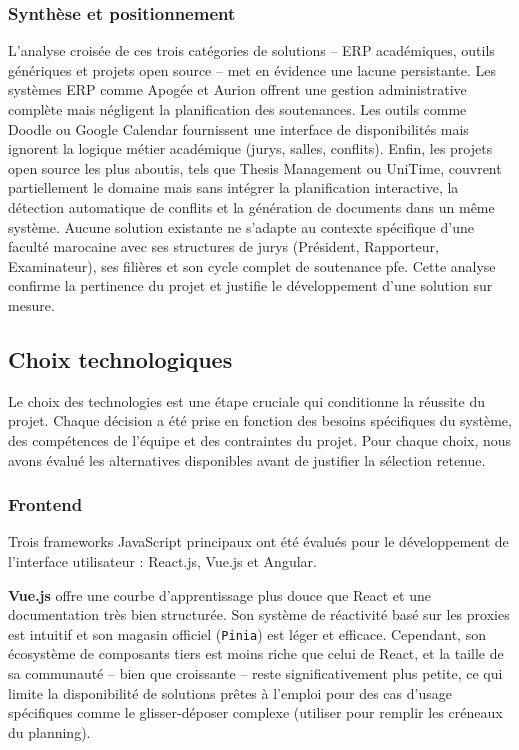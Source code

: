 \subsubsection{Synthèse et positionnement}
\label{ch2:synthese}

L'analyse croisée de ces trois catégories de solutions -- ERP académiques, outils génériques et projets open source -- met en évidence une lacune persistante. Les systèmes ERP comme Apogée et Aurion offrent une gestion administrative complète mais négligent la planification des soutenances. Les outils comme Doodle ou Google Calendar fournissent une interface de disponibilités mais ignorent la logique métier académique (jurys, salles, conflits). Enfin, les projets open source les plus aboutis, tels que Thesis Management ou UniTime, couvrent partiellement le domaine mais sans intégrer la planification interactive, la détection automatique de conflits et la génération de documents dans un même système. Aucune solution existante ne s'adapte au contexte spécifique d'une faculté marocaine avec ses structures de jurys (Président, Rapporteur, Examinateur), ses filières et son cycle complet de soutenance \acrshort{pfe}. Cette analyse confirme la pertinence du projet et justifie le développement d'une solution sur mesure.

\subsection{Choix technologiques}
\label{ch2:choix_technologiques}

Le choix des technologies est une étape cruciale qui conditionne la réussite du projet. Chaque décision a été prise en fonction des besoins spécifiques du système, des compétences de l'équipe et des contraintes du projet. Pour chaque choix, nous avons évalué les alternatives disponibles avant de justifier la sélection retenue.

\subsubsection{Frontend}
\label{ch2:frontend}

Trois frameworks JavaScript principaux ont été évalués pour le développement de l'interface utilisateur : React.js, Vue.js et Angular.

\textbf{Vue.js} offre une courbe d'apprentissage plus douce que React et une documentation très bien structurée. Son système de réactivité basé sur les proxies est intuitif et son magasin officiel (\texttt{Pinia}) est léger et efficace. Cependant, son écosystème de composants tiers est moins riche que celui de React, et la taille de sa communauté -- bien que croissante -- reste significativement plus petite, ce qui limite la disponibilité de solutions prêtes à l'emploi pour des cas d'usage spécifiques comme le glisser-déposer complexe (utiliser pour remplir les créneaux du planning).

